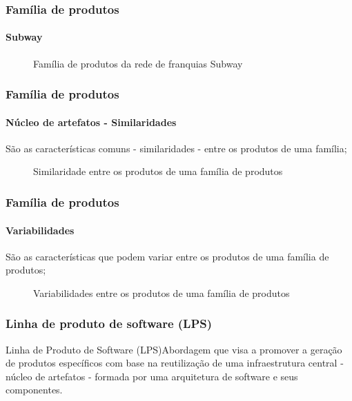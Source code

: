 \begin{frame}
\frametitle{Família de produtos}
\framesubtitle{Subway}

\begin{figure}
\caption{Família de produtos da rede de franquias Subway}
\end{figure}

\end{frame}

\begin{frame}
\frametitle{Família de produtos}
\framesubtitle{Núcleo de artefatos - Similaridades}

São as características comuns - similaridades - entre os produtos de uma família;

    \centering
    \begin{figure}
    \caption{Similaridade entre os produtos de uma família de produtos}
    \end{figure}

\end{frame}

\begin{frame}
\frametitle{Família de produtos}
\framesubtitle{Variabilidades}

São as características que podem variar entre os produtos de uma família de produtos;

    \centering
    \begin{figure}
    \caption{Variabilidades entre os produtos de uma família de produtos}
    \end{figure}

\end{frame}

\begin{frame}
\frametitle{Linha de produto de software (LPS)}

\begin{block}{Linha de Produto de Software (LPS)}Abordagem que visa a promover a geração de produtos específicos com base na reutilização de uma infraestrutura central - núcleo de artefatos - formada por uma arquitetura de software e seus componentes.\end{block}

\end{frame}

